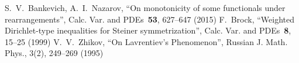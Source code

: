 \begin{thebibliography}{99}
 S.~V.~Bankevich, A.~I.~Nazarov, ``On monotonicity of some functionals under rearrangements'',
Calc. Var. and PDEs~{\bf53}, 627--647 (2015)
 F.~Brock, ``Weighted Dirichlet-type inequalities for Steiner symmetrization'',
Calc. Var. and PDEs~{\bf8}, 15--25 (1999)
 V.~V.~Zhikov, ``On Lavrentiev's Phenomenon'', Russian J. Math. Phys., 3(2), 249--269 (1995)
\end{thebibliography}
